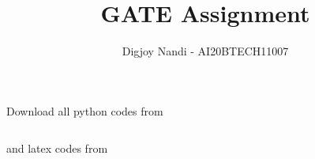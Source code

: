 \documentclass[journal,12pt,twocolumn]{IEEEtran}
\DeclareMathOperator*{\Res}{Res}
\begin{document}
\newcommand{\BEQA}{\begin{eqnarray}}
\newcommand{\EEQA}{\end{eqnarray}}
\newcommand{\define}{\stackrel{\triangle}{=}}

\raggedbottom
\setlength{\parindent}{0pt}
\providecommand{\mbf}{\mathbf}
\providecommand{\pr}[1]{\ensuremath{\Pr\left(#1\right)}}
\providecommand{\qfunc}[1]{\ensuremath{Q\left(#1\right)}}
\providecommand{\sbrak}[1]{\ensuremath{{}\left[#1\right]}}
\providecommand{\lsbrak}[1]{\ensuremath{{}\left[#1\right.}}
\providecommand{\rsbrak}[1]{\ensuremath{{}\left.#1\right]}}
\providecommand{\brak}[1]{\ensuremath{\left(#1\right)}}
\providecommand{\lbrak}[1]{\ensuremath{\left(#1\right.}}
\providecommand{\rbrak}[1]{\ensuremath{\left.#1\right)}}
\providecommand{\cbrak}[1]{\ensuremath{\left\{#1\right\}}}
\providecommand{\lcbrak}[1]{\ensuremath{\left\{#1\right.}}
\providecommand{\rcbrak}[1]{\ensuremath{\left.#1\right\}}}
\theoremstyle{remark}
\newtheorem{rem}{Remark}
\newcommand{\sgn}{\mathop{\mathrm{sgn}}}
\providecommand{\abs}[1]{\vert#1\vert}
\providecommand{\res}[1]{\Res\displaylimits_{#1}} 
\providecommand{\norm}[1]{\lVert#1\rVert}
\providecommand{\mtx}[1]{\mathbf{#1}}
\providecommand{\mean}[1]{E[ #1 ]}
\providecommand{\fourier}{\overset{\mathcal{F}}{ \rightleftharpoons}}
\providecommand{\system}{\overset{\mathcal{H}}{ \longleftrightarrow}}
\newcommand{\solution}{\noindent \textbf{Solution: }}
\newcommand{\cosec}{\,\text{cosec}\,}
\providecommand{\dec}[2]{\ensuremath{\overset{#1}{\underset{#2}{\gtrless}}}}
\newcommand{\myvec}[1]{\ensuremath{\begin{pmatrix}#1\end{pmatrix}}}
\newcommand{\mydet}[1]{\ensuremath{\begin{vmatrix}#1\end{vmatrix}}}
\makeatletter
{}
\makeatother
\let\StandardTheFigure\thefigure
\let\vec\mathbf
\renewcommand{\thefigure}{\theproblem}
\def\putbox#1#2#3{\makebox[0in][l]{\makebox[#1][l]{}\raisebox{\baselineskip}[0in][0in]{\raisebox{#2}[0in][0in]{#3}}}}
     \def\rightbox#1{\makebox[0in][r]{#1}}
     \def\centbox#1{\makebox[0in]{#1}}
     \def\topbox#1{\raisebox{-\baselineskip}[0in][0in]{#1}}
     \def\midbox#1{\raisebox{-0.5\baselineskip}[0in][0in]{#1}}
\vspace{3cm}
\title{GATE Assignment}
\author{Digjoy Nandi - AI20BTECH11007}
\maketitle
\newpage
\bigskip
\renewcommand{\thefigure}{\theenumi}
\renewcommand{\thetable}{\theenumi}
Download all python codes from 
\begin{lstlisting}

\end{lstlisting}
%
and latex codes from 
%
\begin{lstlisting}

\end{lstlisting}
\end{document}
